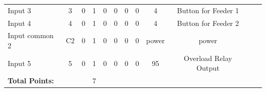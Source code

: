 \begin{table}[!htp]
{\begin{tabular}{lcccccccccll}
			Input 3                     & 3                       & 0                                           & 1                                          & 0           & 0           & 0            & 0                & 4     & Button for Feeder 1          &                                                   \\
			Input 4                     & 4                       & 0                                           & 1                                          & 0           & 0           & 0            & 0                & 4     & Button for Feeder 2          &                                                   \\
			Input common 2              & C2                      & 0                                           & 1                                          & 0           & 0           & 0            & 0                & power & power                        &                                                   \\
			Input 5                     & 5                       & 0                                           & 1                                          & 0           & 0           & 0            & 0                & 95    & Overload Relay Output        &                                                   \\ \midrule
			\textbf{Total Points:}      &                         &                                             & 7                                          &             &             &              &                  &       &                              &                                  &                \\ \bottomrule
		\end{tabular}
	}
\end{table}
